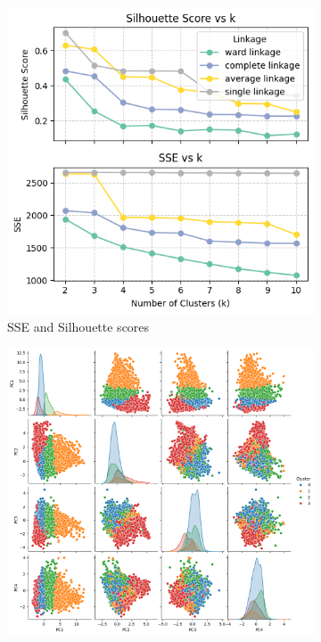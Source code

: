 \begin{figure}[H]
    \centering
    \begin{subfigure}[b]{0.49\textwidth}
        \centering
        \includegraphics[width=\textwidth]{plots/sse_silh_kmeans.png}
        \caption{SSE and Silhouette scores}
        \label{fig:sse_silh_kmeans}
    \end{subfigure}
    \begin{subfigure}[b]{0.49\textwidth}
        \centering
        \includegraphics[width=\textwidth]{plots/pairplot_kmeans.png}

\end{subfigure}
\end{figure}
